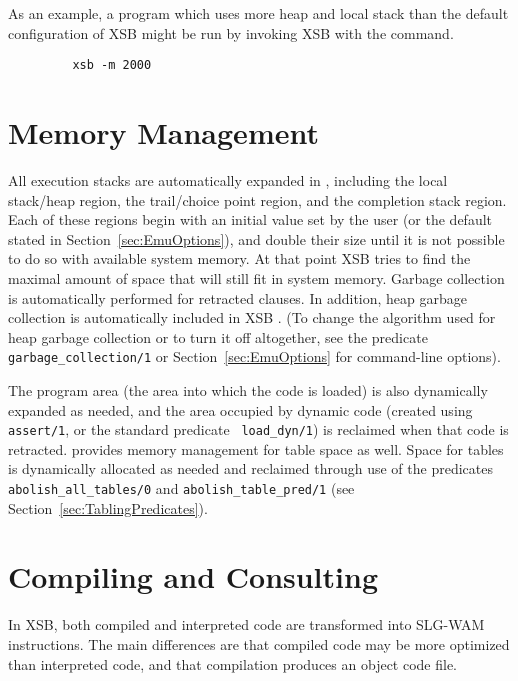 As an example, a program which uses more heap and local stack than the
default configuration of XSB might be run by invoking XSB with the command.
\begin{verbatim}
         xsb -m 2000
\end{verbatim}


\section{Memory Management}\label{memory_management}
All execution stacks are automatically expanded in \version{},
including the local stack/heap region, the trail/choice point region,
and the completion stack region.  Each of these regions begin with an
initial value set by the user (or the default stated in
Section~\ref{sec:EmuOptions}), and double their size until it is not
possible to do so with available system memory.  At that point XSB
tries to find the maximal amount of space that will still fit in
system memory.  Garbage collection is automatically performed for
retracted clauses.  In addition, heap garbage collection is
automatically included in XSB \cite{CaSC01,CATmem@ISMM-98}.  (To
change the algorithm used for heap garbage collection or to turn it
off altogether, see the predicate {\tt garbage\_collection/1} or
Section~\ref{sec:EmuOptions} for command-line options).

The program area (the area into which the code is loaded) is also
dynamically expanded as needed, and the area occupied by dynamic code
(created using {\tt assert/1}, or the standard predicate {\tt
load\_dyn/1}) is reclaimed when that code is retracted.  \version{}
provides memory management for table space as well.  Space for tables
is dynamically allocated as needed and reclaimed through use of the
predicates {\tt abolish\_all\_tables/0} and {\tt abolish\_table\_pred/1}
(see Section~\ref{sec:TablingPredicates}).

\section{Compiling and Consulting} \label{Consulting}
In XSB, both compiled and interpreted code are transformed into
SLG-WAM instructions.  The main differences are that compiled code may
be more optimized than interpreted code, and that compilation produces
an object code file.

